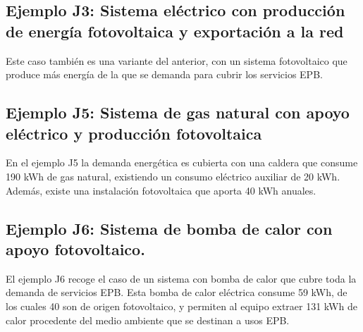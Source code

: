 \documentclass[10pt,notitlepage,oneside,a4paper]{article}
\begin{document}
\subsection{Ejemplo J3: Sistema eléctrico con producción de energía fotovoltaica y exportación a la red}

Este caso también es una variante del anterior, con un sistema fotovoltaico que produce más energía de la que se demanda para cubrir los servicios EPB.





\subsection{Ejemplo J5: Sistema de gas natural con apoyo eléctrico y producción fotovoltaica}
En el ejemplo J5 la demanda energética es cubierta con una caldera que consume 190 kWh de gas natural, existiendo un consumo eléctrico auxiliar de 20 kWh. Además, existe una instalación fotovoltaica que aporta 40 kWh anuales.





\subsection{Ejemplo J6: Sistema de bomba de calor con apoyo fotovoltaico.}
El ejemplo J6 recoge el caso de un sistema con bomba de calor que cubre toda la demanda de servicios EPB. Esta bomba de calor eléctrica consume 59 kWh, de los cuales 40 son de origen fotovoltaico, y permiten al equipo extraer 131 kWh de calor procedente del medio ambiente que se destinan a usos EPB.




\end{document}

